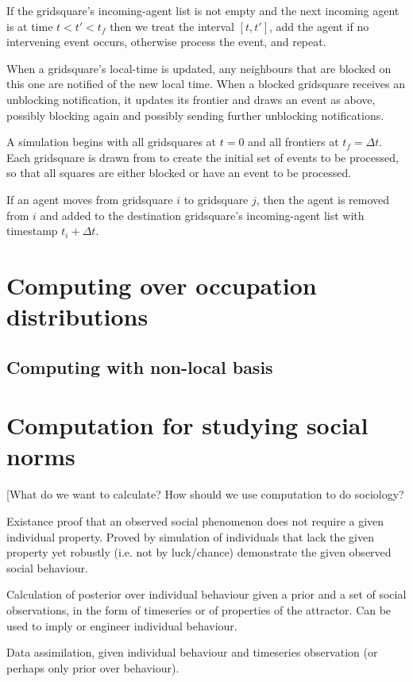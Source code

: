 \documentclass[a4paper]{article}
\begin{document}
If the gridsquare's incoming-agent list is not empty and the next incoming agent is at time  $t < t' < t_f$ then we treat the interval $[t, t']$, add the agent if no intervening event occurs, otherwise process the event, and repeat.

When a gridsquare's local-time is updated, any neighbours that are blocked on this one are notified of the new local time. When a blocked gridsquare receives an unblocking notification, it updates its frontier and draws an event as above, possibly blocking again and possibly sending further unblocking notifications.

A simulation begins with all gridsquares at $t=0$ and all frontiers at $t_f=\Delta t$. Each gridsquare is drawn from to create the initial set of events to be processed, so that all squares are either blocked or have an event to be processed.

If an agent moves from gridsquare $i$ to gridsquare $j$, then the agent is removed from $i$ and added to the destination gridsquare's incoming-agent list with timestamp $t_i + \Delta t$.

\section{Computing over occupation distributions}

\subsection{Computing with non-local basis}



\section{Computation for studying social norms}

[What do we want to calculate? How should we use computation to do sociology?

Existance proof that an observed social phenomenon does not require a given individual property. Proved by simulation of individuals that lack the given property yet robustly (i.e. not by luck/chance) demonstrate the given observed social behaviour.

Calculation of posterior over individual behaviour given a prior and a set of social observations, in the form of timeseries or of properties of the attractor. Can be used to imply or engineer individual behaviour.

Data assimilation, given individual behaviour and timeseries observation (or perhaps only prior over behaviour).
\end{document}
